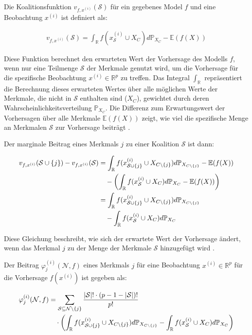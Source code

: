Die Koalitionsfunktion $v_{f, x^{(i)}}(\mathcal{S})$ für ein gegebenes Model $f$ und eine Beobachtung $x^{(i)}$ ist definiert als:

\begin{align}
    v_{f, x^{(i)}}(\mathcal{S}) = \int_{\mathbb{R}} f(x^{(i)}_{\mathcal{S}} \cup X_{C}) d\mathbb{P}_{X_{C}} - \mathbb{E}(f(X))
\end{align}

Diese Funktion berechnet den erwarteten Wert der Vorhersage des Modells $f$, wenn nur eine Teilmenge $\mathcal{S}$ der 
Merkmale genutzt wird, um die Vorhersage für die spezifische Beobachtung $x^{(i)} \in \mathbb{R}^{p}$ zu treffen. 
Das Integral $\int_{\mathbb{R}}$ repräsentiert die Berechnung dieses erwarteten Wertes über alle möglichen Werte der Merkmale, 
die nicht in $\mathcal{S}$ enthalten sind ($X_C$), gewichtet durch deren Wahrscheinlichkeitsverteilung $\mathbb{P}_{X_{C}}$. 
Die Differenz zum Erwartungswert der Vorhersagen über alle Merkmale $\mathbb{E}(f(X))$ zeigt, 
wie viel die spezifische Menge an Merkmalen $\mathcal{S}$ zur Vorhersage beiträgt \cite[S. 221, S. 27]{Molnar_2022, Molnar_2023}.

Der marginale Beitrag eines Merkmals $j$ zu einer Koalition $\mathcal{S}$ ist dann:

\begin{align}
    v_{f, x^{(i)}}(\mathcal{S} \cup \{j\}) - v_{f, x^{(i)}}(\mathcal{S}) &= \int_{\mathbb{R}} f(x^{(i)}_{\mathcal{S} \cup \{j\}} \cup X_{C \setminus \{j\}}) d\mathbb{P}_{X_{C \setminus \{j\}}} - \mathbb{E}(f(X)) \\ \notag
    &\quad - \left( \int_{\mathbb{R}} f(x^{(i)}_{\mathcal{S}} \cup X_{C}) d\mathbb{P}_{X_{C}} - \mathbb{E}(f(X)) \right) \\ \notag
    &= \int_{\mathbb{R}} f(x^{(i)}_{\mathcal{S} \cup \{j\}} \cup X_{C \setminus \{j\}}) d\mathbb{P}_{X_{C \setminus \{j\}}} \\ \notag
    &\quad - \int_{\mathbb{R}} f(x^{(i)}_{\mathcal{S}} \cup X_{C}) d\mathbb{P}_{X_{C}}
\end{align}

Diese Gleichung beschreibt, wie sich der erwartete Wert der Vorhersage ändert, wenn das Merkmal $j$ zu der Menge der Merkmale $\mathcal{S}$ hinzugefügt wird \cite[S. 29]{Molnar_2023}.

Der Beitrag $\varphi_j^{(i)}(\mathcal{N}, f)$ eines Merkmals $j$ für eine Beobachtung $x^{(i)} \in \mathbb{R}^{p}$ für die Vorhersage $f(x^{(i)})$ ist gegeben als:

\begin{align}
    \label{eq:shap-eq}
    \varphi^{(i)}_{j} (\mathcal{N}, f) &= \sum_{\mathcal{S} \subseteq \mathcal{N} \setminus \{j\}} \frac{|\mathcal{S}|! \cdot (p - 1 - |\mathcal{S}|)!}{p!} \\ \notag
    &\quad \cdot \left( \int_{\mathbb{R}} f(x^{(i)}_{\mathcal{S} \cup \{j\}} \cup X_{C \setminus \{j\}}) d\mathbb{P}_{X_{C \setminus \{j\}}} -
    \int_{\mathbb{R}} f(x^{(i)}_{\mathcal{S}} \cup X_{C}) d\mathbb{P}_{X_{C}} \right) 
\end{align}

